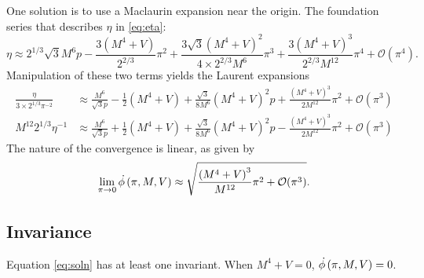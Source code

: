 \documentclass[11pt, oneside]{article}   	%
\newcommand{\pd}[0]				   {\skew{6}{\dot}{\phi}}
\newcommand{\phidot}[0]      {\pd\left( \pi, M, V \right)}
\newcommand{\inv}[0]     {\left( M^{4} + V \right)}
\begin{document}
One solution is to use a Maclaurin expansion near the origin. The foundation series that describes $\eta$ in \eqref{eq:eta}:
  \begin{equation*}   %
   \eta \approx 2^{1/3}\sqrt{3} M^{6} p - 
        \frac{3(M^{4}+V)}{2^{2/3}} \pi^{2} + 
        \frac{3\sqrt{3}\inv^{2}}{4\times2^{2/3}M^{6}}\pi^{3} +
        \frac{3\inv^{3}}{2^{2/3}M^{12}}\pi^{4} +
        \mathcal{O}\left( \pi^{4}\right).
  \end{equation*}
Manipulation of these two terms yields the Laurent expansions
  \begin{equation*}   %
   \begin{split}
     \frac{\eta }{3\times 2^{1/3}\pi^{-2}} &\approx 
     		\frac{M^{6}}{\sqrt{3}p} - \frac{1}{2}\inv + \frac{\sqrt{3}}{8M^{6}} \inv^{2}p + \frac{\inv^{3}}{2M^{12}} \pi^{2} + \mathcal{O}(\pi^{3}) \\
     M^{12} 2^{1/3} \eta^{-1} &\approx 
     		\frac{M^{6}}{\sqrt{3}p} + \frac{1}{2}\inv + \frac{\sqrt{3}}{8M^{6}} \inv^{2}p - \frac{\inv^{3}}{2M^{12}} \pi^{2} + \mathcal{O}(\pi^{3})
   \end{split}
  \end{equation*}
The nature of the convergence is linear, as given by
  \begin{equation}   %
    \lim_{\pi\to0}\phidot \approx \sqrt{\frac{\inv^{3}}{M^{12}} \pi^{2} + \mathcal{O}(\pi^{3})}.
    \label{eq:tozero}
  \end{equation}


\subsection{Invariance}
Equation \eqref{eq:soln} has at least one invariant. When $M^{4} + V = 0$, $\phidot=0$.
\end{document}

